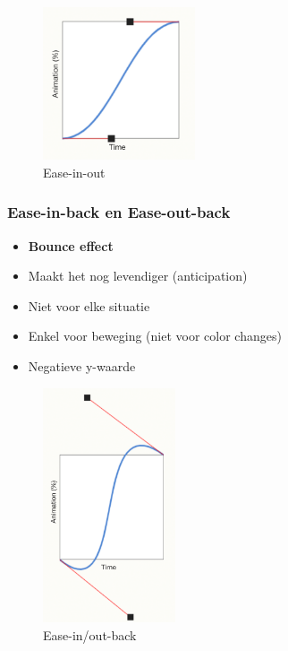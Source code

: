 \documentclass{article}
\newcommand{\bold}[1]{\textbf{#1}}
\begin{document}
\begin{figure}[H]
    \centering
    \includegraphics[width=0.4\textwidth]{animation-ease-in-out.png}
    \caption{Ease-in-out}
\end{figure}


\subsubsection{Ease-in-back en Ease-out-back}

\begin{itemize}
    \item \bold{Bounce effect}
    \item Maakt het nog levendiger (anticipation)
    \item Niet voor elke situatie
    \item Enkel voor beweging (niet voor color changes)
    \item Negatieve y-waarde
\end{itemize}

\begin{figure}[H]
    \centering
    \includegraphics[width=0.35\textwidth]{ease-in-out-back.png}
    \caption{Ease-in/out-back}
\end{figure}
\end{document}
